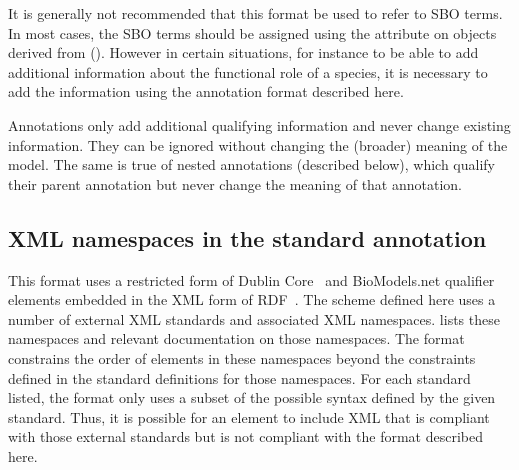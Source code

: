 It is generally not recommended that this format be used to refer
to SBO terms.  In most cases, the SBO terms should be assigned
using the attribute  on objects derived from \SBase
().  However in certain situations, for
instance to be able to add additional information about the
functional role of a species, it is necessary to add the
information using the annotation format described here.

\begin{blockChanged}

Annotations only add additional qualifying information and never change existing information.  They can be ignored without changing the (broader) meaning of the model.  The same is true of nested annotations (described below), which qualify their parent annotation but never change the meaning of that annotation.

\end{blockChanged}


\subsection{XML namespaces in the standard annotation}

This format uses a restricted form of Dublin
Core~\citep{DCMI:2003} and BioModels.net qualifier elements  embedded in the XML form
of RDF~\citep{w3c:2004}.  The scheme defined here uses a number of
external XML standards and associated XML namespaces.
 lists these
namespaces and relevant documentation on those namespaces.  The
format constrains the order of elements in these namespaces beyond
the constraints defined in the standard definitions for those
namespaces.  For each standard listed, the format only uses a
subset of the possible syntax defined by the given standard.
Thus, it is possible for an  element to include
XML that is compliant with those external standards but is not
compliant with the format described here.

